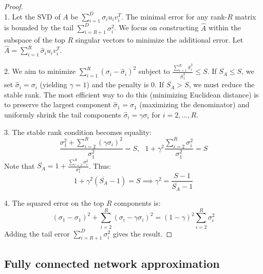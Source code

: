 \documentclass{article}
\begin{document}
            \begin{proof} $~~$\\
                1. Let the SVD of $A$ be $\sum_{i=1}^D \sigma_i u_i v_i^T$. The minimal error for any rank-$R$ matrix is bounded by the tail $\sum_{i=R+1}^D \sigma_i^2$. We focus on constructing $\hat{A}$ within the subspace of the top $R$ singular vectors to minimize the additional error.
                    Let $\hat{A}= \sum_{i=1}^R \hat{\sigma}_i u_i v_i^T$.

                2.  We aim to minimize $\sum_{i=1}^R (\sigma_i - \hat{\sigma}_i)^2$ subject to $\frac{\sum_{i=1}^R \hat{\sigma}_i^2}{\hat{\sigma}_1^2} \leqslant S$.
                    If $\overline{S_A} \leqslant S$, we set $\hat{\sigma}_i = \sigma_i$ (yielding $\gamma=1$) and the penalty is 0.
                    If $\overline{S_A} > S$, we must reduce the stable rank. The most efficient way to do this (minimizing Euclidean distance) is to preserve the largest component $\hat{\sigma}_1 = \sigma_1$ (maximizing the denominator) and uniformly shrink the tail components $\hat{\sigma}_i = \gamma \sigma_i$ for $i=2, \dots, R$.

                3.  The stable rank condition becomes equality:
                    $$ \frac{\sigma_1^2 + \sum_{i=2}^R (\gamma \sigma_i)^2}{\sigma_1^2} = S, ~~~ 1 + \gamma^2 \frac{\sum_{i=2}^R \sigma_i^2}{\sigma_1^2} = S $$
                    Note that $\overline{S_A} = 1 + \frac{\sum_{i=2}^R \sigma_i^2}{\sigma_1^2}$. Thus:
                    $$ 1 + \gamma^2 (\overline{S_A} - 1) = S \implies \gamma^2 = \frac{S - 1}{\overline{S_A} - 1} $$

                4.  
                    The squared error on the top $R$ components is:
                    $$ (\sigma_1 - \sigma_1)^2 + \sum_{i=2}^R (\sigma_i - \gamma \sigma_i)^2 = (1-\gamma)^2 \sum_{i=2}^R \sigma_i^2 $$
                    Adding the tail error $\sum_{i=R+1}^D \sigma_i^2$ gives the result.
            \end{proof}
            


        \subsection{Fully connected network approximation}
\end{document}
